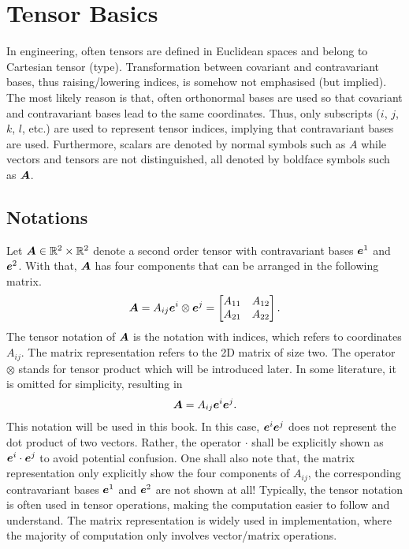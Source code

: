 \chapter{Tensor Basics}
In engineering, often tensors are defined in Euclidean spaces and belong to Cartesian tensor (type). Transformation between covariant and contravariant bases, thus raising/lowering indices, is somehow not emphasised (but implied). The most likely reason is that, often orthonormal bases are used so that covariant and contravariant bases lead to the same coordinates. Thus, only subscripts ($i$, $j$, $k$, $l$, etc.) are used to represent tensor indices, implying that contravariant bases are used. Furthermore, scalars are denoted by normal symbols such as $A$ while vectors and tensors are not distinguished, all denoted by boldface symbols such as $\bm{A}$.
\section{Notations}
Let $\bm{A}\in\mathbb{R}^2\times\mathbb{R}^2$ denote a second order tensor with contravariant bases $\bm{e}^1$ and $\bm{e}^2$. With that, $\bm{A}$ has four components that can be arranged in the following matrix.
\begin{gather}\label{eq:matrix_tensor}
\bm{A}=A_{ij}\bm{e}^i\otimes\bm{e}^j=\begin{bmatrix}
A_{11}&A_{12}\\
A_{21}&A_{22}
\end{bmatrix}.
\end{gather}
The tensor notation of $\bm{A}$ is the notation with indices, which refers to coordinates $A_{ij}$. The matrix representation refers to the 2D matrix of size two. The operator $\otimes$ stands for tensor product which will be introduced later. In some literature, it is omitted for simplicity, resulting in
\begin{gather}
\bm{A}=A_{ij}\bm{e}^i\bm{e}^j.
\end{gather}
This notation will be used in this book. In this case, $\bm{e}^i\bm{e}^j$ does not represent the dot product of two vectors. Rather, the operator $\cdot$ shall be explicitly shown as $\bm{e}^i\cdot\bm{e}^j$ to avoid potential confusion.
One shall also note that, the matrix representation only explicitly show the four components of $A_{ij}$, the corresponding contravariant bases $\bm{e}^1$ and $\bm{e}^2$ are not shown at all!
Typically, the tensor notation is often used in tensor operations, making the computation easier to follow and understand.
The matrix representation is widely used in implementation, where the majority of computation only involves vector/matrix operations.

